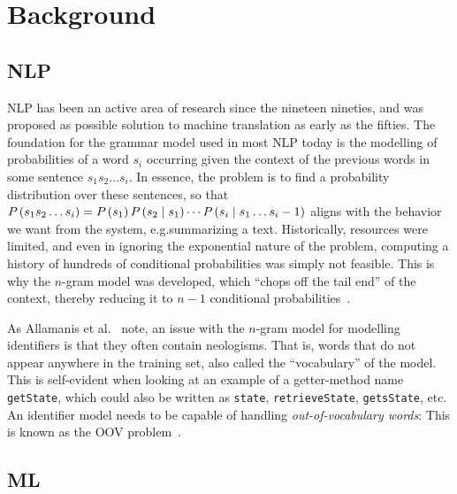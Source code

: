 \documentclass[conference]{IEEEtran}
\def\P(#1){\ensuremath{P\mkern-0.5mu\left( #1 \right)}}
\begin{document}

\section{Background}
\label{sec:Background}

\subsection{\acl{NLP}}
\label{ssec:Natural-Language-Processing}

\ac{NLP} has been an active area of research since the nineteen nineties, and was proposed
as possible solution to machine translation as early as the fifties. The foundation for
the grammar model used in most \ac{NLP} today is the modelling of probabilities of a word
$s_i$ occurring given the context of the previous words in some sentence $s_1 s_2 \ldots
s_i$. In essence, the problem is to find a probability distribution over these sentences,
so that $\P(s_1 s_2 \ldots s_i) = \P(s_1) \P(s_2 \mid s_1) \cdots \P(s_i \mid s_1 \ldots
s_{i-1})$ aligns with the behavior we want from the system, e.g.\@ summarizing a text.
Historically, resources were limited, and even in ignoring the exponential nature of the
problem, computing a history of hundreds of conditional probabilities was simply not
feasible. This is why the $n$-gram model was developed, which ``chops off the tail end''
of the context, thereby reducing it to $n - 1$ conditional
probabilities~\cite{Brown1990StatMT}.

As Allamanis et al.\@~\cite{Allamanis2015Suggesting} note, an issue with the $n$-gram
model for modelling identifiers is that they often contain neologisms. That is, words that
do not appear anywhere in the training set, also called the ``vocabulary'' of the model.
This is self-evident when looking at an example of a getter-method name \verb-getState-,
which could also be written as \verb-state-, \verb-retrieveState-,  \verb-getsState-, etc.
An identifier model needs to be capable of handling \emph{out-of-vocabulary words}: This
is known as the \ac{OOV} problem~\cite{Shi2022Splitting}.


\subsection{\acl{ML}}
\label{ssec:Machine-Learning}
\end{document}
